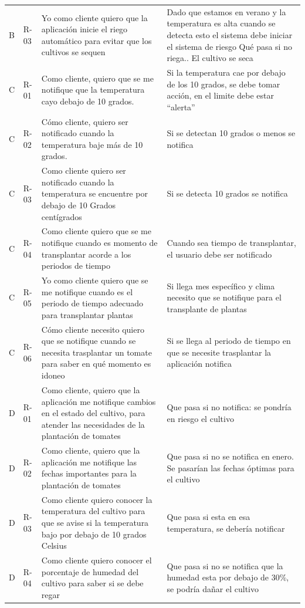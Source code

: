 \documentclass[12pt,letterpaper,oneside]{report}
\begin{document}
{\begin{xltabular}{\textwidth}{@{}L{1.0cm} L{1.4cm} Y Y@{}}
B & R-03 & Yo como cliente quiero que la aplicación inicie el riego automático para evitar que los cultivos se sequen & Dado que estamos en verano y la temperatura es alta cuando se detecta esto el sistema debe iniciar el sistema de riesgo Qué pasa si no riega.. El cultivo se seca \\
\addlinespace
C & R-01 & Como cliente, quiero que se me notifique que la temperatura cayo debajo de 10 grados. & Si la temperatura cae por debajo de los 10 grados, se debe tomar acción, en el limite debe estar ``alerta'' \\
C & R-02 & Cómo cliente, quiero ser notificado cuando la temperatura baje más de 10 grados. & Si se detectan 10 grados o menos se notifica \\
C & R-03 & Como cliente quiero ser notificado cuando la temperatura se encuentre por debajo de 10 Grados centígrados & Si se detecta 10 grados se notifica \\
C & R-04 & Como cliente quiero que se me notifique cuando es momento de transplantar acorde a los periodos de tiempo & Cuando sea tiempo de transplantar, el usuario debe ser notificado \\
C & R-05 & Yo como cliente quiero que se me notifique cuando es el periodo de tiempo adecuado para transplantar plantas & Si llega mes específico y clima necesito que se notifique para el transplante de plantas \\
C & R-06 & Cómo cliente necesito quiero que se notifique cuando se necesita trasplantar un tomate para saber en qué momento es idoneo & Si se llega al periodo de tiempo en que se necesite trasplantar la aplicación notifica \\
\addlinespace
D & R-01 & Como cliente, quiero que la aplicación me notifique cambios en el estado del cultivo, para atender las necesidades de la plantación de tomates & Que pasa si no notifica: se pondría en riesgo el cultivo \\
D & R-02 & Como cliente, quiero que la aplicación me notifique las fechas importantes para la plantación de tomates & Que pasa si no se notifica en enero. Se pasarían las fechas óptimas para el cultivo \\
D & R-03 & Como cliente quiero conocer la temperatura del cultivo para que se avise si la temperatura bajo por debajo de 10 grados Celsius & Que pasa si esta en esa temperatura, se debería notificar \\
D & R-04 & Como cliente quiero conocer el porcentaje de humedad del cultivo para saber si se debe regar & Que pasa si no se notifica que la humedad esta por debajo de 30\%, se podría dañar el cultivo \\
\end{xltabular}}
\end{document}

